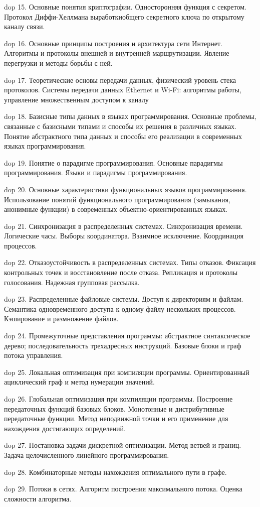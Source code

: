 dop 15. Основные  понятия  криптографии.  Односторонняя  функция  с  секретом.  Протокол  Диффи-Хеллмана выработкиобщего секретного ключа по открытому каналу связи.

dop 16. Основные  принципы  построения  и  архитектура  сети  Интернет.  Алгоритмы  и  протоколы  внешней  и внутренней маршрутизации. Явление перегрузки и методы борьбы с ней.

dop 17. Теоретические основы передачи данных, физический уровень стека протоколов. Системы передачи данных Ethernet и Wi-Fi: алгоритмы работы, управление множественным доступом к каналу

dop 18. Базисные типы данных в языках программирования. Основные проблемы, связанные с базисными типами и способы их решения в различных языках. Понятие абстрактного типа данных и способы его реализации в современных языках программирования.

dop 19. Понятие  о  парадигме  программирования.  Основные  парадигмы  программирования.  Языки  и  парадигмы программирования.

dop 20. Основные  характеристики  функциональных  языков  программирования.  Использование  понятий функционального  программирования  (замыкания,  анонимные функции)  в  современных  объектно-ориентированных языках.

dop 21. Синхронизация  в  распределенных  системах.  Синхронизация  времени.  Логические  часы.  Выборы координатора. Взаимное исключение. Координация процессов.

dop 22. Отказоустойчивость  в  распределенных  системах.  Типы  отказов.  Фиксация  контрольных  точек  и восстановление после отказа. Репликация и протоколы голосования. Надежная групповая рассылка.

dop 23. Распределенные файловые системы. Доступ к директориям и файлам. Семантика одновременного доступа к одному файлу нескольких процессов. Кэширование и размножение файлов.

dop 24. Промежуточные  представления  программы:  абстрактное  синтаксическое  дерево;  последовательность трехадресных инструкций. Базовые блоки и граф потока управления.

dop 25. Локальная  оптимизация при  компиляции  программы. Ориентированный  ациклический  граф  и  метод нумерации значений.

dop 26. Глобальная оптимизация при компиляции программы. Построение передаточных функций базовых блоков. Монотонные и дистрибутивные передаточные функции. Метод неподвижной точки и его применение для нахождения достигающих определений.

dop 27. Постановка задачи дискретной оптимизации. Метод ветвей и границ. Задача целочисленного линейного программирования.

dop 28. Комбинаторные методы нахождения оптимального пути в графе.

dop 29. Потоки в сетях. Алгоритм построения максимального потока. Оценка сложности алгоритма.